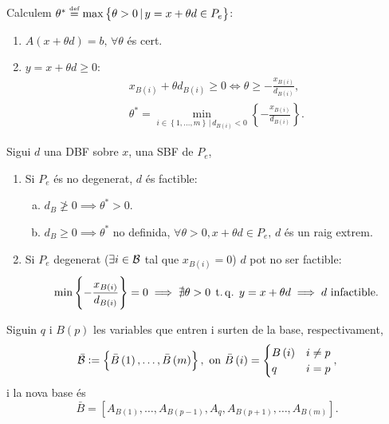 \begin{prop}
    Calculem $\theta^* \stackrel{\text{\tiny def}}{=} \max \left\{ \theta > 0 \, |\, y = x + \theta d \in P_e\right\}$:
    \begin{enumerate}
        \item $A\left(x + \theta d\right) = b,\, \forall \theta$ és cert.
        \item $y = x + \theta d \geq 0$:
            \begin{gather*}
                x_{B\left(i\right)} + \theta d_{B\left(i\right)} \geq 0 \iff \theta \geq -\frac{x_{B\left(i\right)}}{d_{B\left(i\right)}}, \\
                \theta^* = \min_{i \in \left\{1, \dots, m \right\} \, |\, d_{B\left(i\right)} < 0} \left\{ - \frac{x_{B\left(i\right)}}{d_{B\left(i\right)}} \right\}.
            \end{gather*}
    \end{enumerate}
\end{prop}
\begin{prop}
    Sigui $d$ una DBF sobre $x$, una SBF de $P_e$,
    \begin{enumerate}
        \item Si $P_e$ és no degenerat, $d$ és factible:
            \begin{enumerate}[a)]
                \item $d_B \ngeq 0 \implies \theta^* > 0$.
                \item $d_B \geq 0 \implies \theta^*$ no definida, $\forall \theta > 0, x + \theta d \in P_e,\, d$ és un raig extrem.
            \end{enumerate}
        \item Si $P_e$ degenerat ($\exists i \in \mathcal{B}$ tal que $x_{B\left(i\right)} = 0$) $d$ pot no ser factible:
            \begin{gather*}
                \min \left\{ -\frac{x_{B\left(i\right)}}{d_{B\left(i\right)}} \right\} = 0 \implies \nexists \theta > 0 \operatorname{\;t.q.\;} y = x+\theta d \implies d \text{ infactible}.
            \end{gather*}
    \end{enumerate}
\end{prop}
\begin{prop}
    Siguin $q$ i $B\left(p\right)$ les variables que entren i surten de la base, respectivament,
    \begin{gather*}
        \bar{\mathcal{B}} := \left\{ \bar{B}\left(1\right), \dots, \bar{B}\left(m\right) \right\}, \text{ on } \bar{B}\left(i\right) =
        \begin{cases}
            B\left(i\right) & i \neq p \\
            q & i = p
        \end{cases},
    \end{gather*}
    i la nova base és
    \[ \bar{B} = \left[A_{B\left(1\right)}, \dots, A_{B\left(p-1\right)}, A_q, A_{B\left(p+1\right)}, \dots, A_{B\left(m\right)} \right]. \]
\end{prop}
